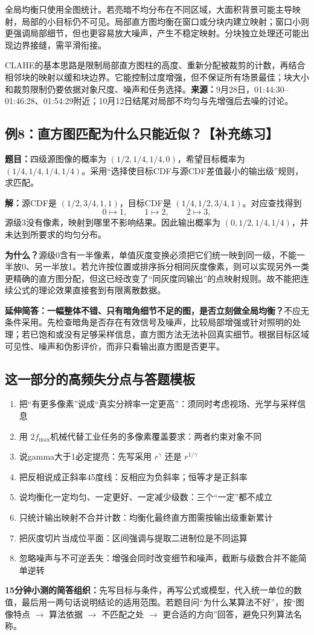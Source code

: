 全局均衡只使用全图统计。若亮暗不均分布在不同区域，大面积背景可能主导映射，局部的小目标仍不可见。局部直方图均衡在窗口或分块内建立映射；窗口小则更强调局部细节，但也更容易放大噪声，产生不稳定映射。分块独立处理还可能出现边界接缝，需平滑衔接。

CLAHE的基本思路是限制局部直方图柱的高度、重新分配被裁剪的计数，再结合相邻块的映射以缓和块边界。它能控制过度增强，但不保证所有场景最佳；块大小和裁剪限制仍要依据对象尺度、噪声和任务选择。\textbf{来源：}9月28日，01:44:30--01:46:28、01:54:29附近；10月12日结尾对局部不均匀与先增强后去噪的讨论。

\subsection{例8：直方图匹配为什么只能近似？【补充练习】}
\textbf{题目：}四级源图像的概率为 $(1/2,1/4,1/4,0)$，希望目标概率为 $(1/4,1/4,1/4,1/4)$。采用“选择使目标CDF与源CDF差值最小的输出级”规则，求匹配。

\textbf{解：}源CDF是 $(1/2,3/4,1,1)$，目标CDF是 $(1/4,1/2,3/4,1)$。对应查找得到
\[
0\mapsto1,\qquad1\mapsto2,\qquad2\mapsto3,
\]
源级3没有像素，映射到哪里不影响结果。因此输出概率为 $(0,1/2,1/4,1/4)$，并未达到所要求的均匀分布。

\textbf{为什么？}源级0含有一半像素，单值灰度变换必须把它们统一映到同一级，不能一半放0、另一半放1。若允许按位置或排序拆分相同灰度像素，则可以实现另外一类更精确的直方图分配，但这已经改变了“同灰度同输出”的点映射规则。故不能把连续公式的理论效果直接套到有限离散数据。

\textbf{延伸简答：一幅整体不错、只有暗角细节不足的图，是否立刻做全局均衡？}不应无条件采用。先检查暗角是否存在有效信号及噪声，比较局部增强或针对照明的处理；若已饱和或没有足够采样信息，直方图方法无法补回真实细节。根据目标区域可见性、噪声和伪影评价，而非只看输出直方图是否更平。

\subsection{这一部分的高频失分点与答题模板}
\begin{enumerate}
\item 把“有更多像素”说成“真实分辨率一定更高”：须同时考虑视场、光学与采样信息
\item 用 $2f_{\max}$机械代替工业任务的多像素覆盖要求：两者约束对象不同
\item 说gamma大于1必定提亮：先写采用 $r^\gamma$ 还是 $r^{1/\gamma}$
\item 把反相说成正斜率45度线：反相应为负斜率；恒等才是正斜率
\item 说均衡化一定均匀、一定更好、一定减少级数：三个“一定”都不成立
\item 只统计输出映射不合并计数：均衡化最终直方图需按输出级重新累计
\item 把灰度切片当成位平面：区间强调与提取二进制位是不同运算
\item 忽略噪声与不可逆丢失：增强会同时改变细节和噪声，截断与级数合并不能简单逆转
\end{enumerate}

\textbf{15分钟小测的简答组织：}先写目标与条件，再写公式或模型，代入统一单位的数值，最后用一两句话说明结论的适用范围。若题目问“为什么某算法不好”，按“图像特点 $\rightarrow$ 算法依据 $\rightarrow$ 不匹配之处 $\rightarrow$ 更合适的方向”回答，避免只列算法名称。

